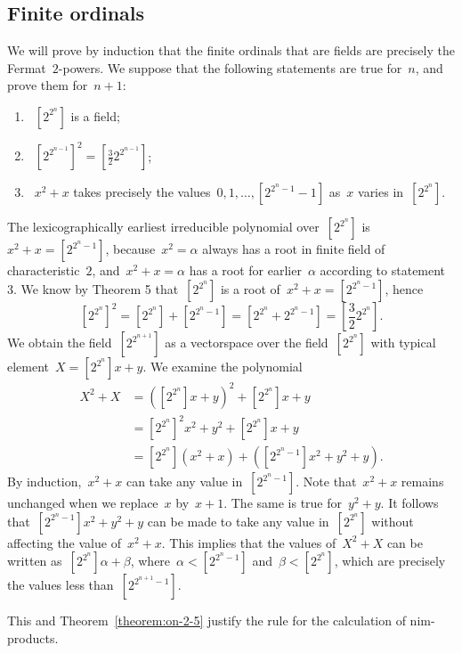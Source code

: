 \subsection{Finite ordinals}
We will prove by induction that the finite ordinals that are fields are precisely the Fermat~$2$-powers. We suppose that the following statements are true for~$n$, and prove them for~$n + 1$:
\begin{enumerate}
  \item~$[2^{2^n}]$ is a field;
	\item~$[2^{2^{n-1}}]^2 = [\frac{3}{2}2^{2^{n-1}}]$;
	\item~$x^2 + x$ takes precisely the values~$0, 1, \dotsc, [2^{2^n-1}-1]$ as~$x$ varies in~$[2^{2^n}]$.
\end{enumerate}
The lexicographically earliest irreducible polynomial over~$[2^{2^n}]$ is~$x^2 + x = [2^{2^n-1}]$, because~$x^2 = \alpha$ always has a root in finite field of characteristic~$2$, and~$x^2 + x = \alpha$ has a root for earlier~$\alpha$ according to statement 3. We know by Theorem 5 that~$[2^{2^n}]$ is a root of~$x^2 + x = [2^{2^n-1}]$, hence
\begin{equation}
  \textstyle [2^{2^n}]^2 = [2^{2^n}] + [2^{2^n-1}] = [2^{2^n} + 2^{2^n-1}] = [\frac{3}{2}2^{2^n}]. 
\end{equation}
We obtain the field~$[2^{2^{n+1}}]$ as a vectorspace over the field~$[2^{2^n}]$ with typical element~$X = [2^{2^n}]x + y$. We examine the polynomial
\begin{align}
  X^2 + X &= ([2^{2^n}]x + y)^2 + [2^{2^n}]x + y \\
  &= [2^{2^n}]^2 x^2 + y^2 + [2^{2^n}]x + y \\
  &= [2^{2^n}](x^2 + x) + ([2^{2^n-1}]x^2 + y^2 + y).
\end{align}
By induction,~$x^2 + x$ can take any value in~$[2^{2^n-1}]$. Note that~$x^2 + x$ remains unchanged when we replace~$x$ by~$x + 1$. The same is true for~$y^2 + y$. It follows that~$[2^{2^n-1}]x^2 + y^2 + y$ can be made to take any value in~$[2^{2^n}]$ without affecting the value of~$x^2 + x$. This implies that the values of~$X^2 + X$ can be written as~$[2^{2^n}]\alpha + \beta$, where~$\alpha < [2^{2^n-1}]$ and~$\beta < [2^{2^n}]$, which are precisely the values less than~$[2^{2^{n+1}-1}]$.

This and Theorem~\ref{theorem:on-2-5} justify the rule for the calculation of nim-products.

